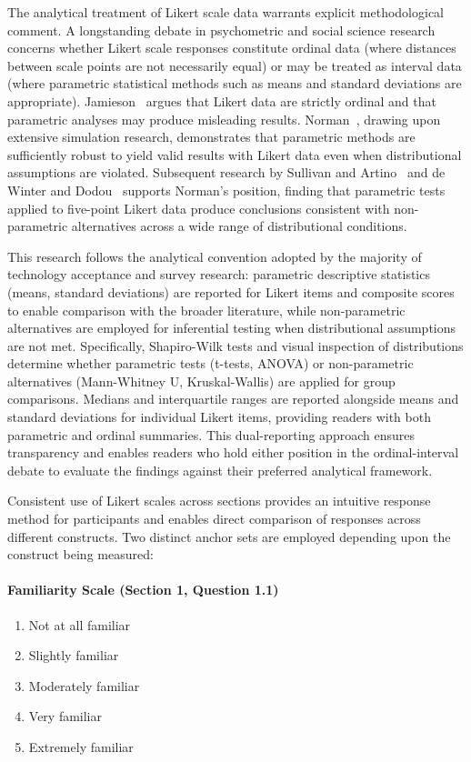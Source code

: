 The analytical treatment of Likert scale data warrants explicit methodological comment. A longstanding debate in psychometric and social science research concerns whether Likert scale responses constitute ordinal data (where distances between scale points are not necessarily equal) or may be treated as interval data (where parametric statistical methods such as means and standard deviations are appropriate). Jamieson~\parencite{Jamieson_2004} argues that Likert data are strictly ordinal and that parametric analyses may produce misleading results. Norman~\parencite{Norman_2010}, drawing upon extensive simulation research, demonstrates that parametric methods are sufficiently robust to yield valid results with Likert data even when distributional assumptions are violated. Subsequent research by Sullivan and Artino~\parencite{Sullivan_Artino_2013} and de Winter and Dodou~\parencite{deWinter_Dodou_2010} supports Norman's position, finding that parametric tests applied to five-point Likert data produce conclusions consistent with non-parametric alternatives across a wide range of distributional conditions.

This research follows the analytical convention adopted by the majority of technology acceptance and survey research: parametric descriptive statistics (means, standard deviations) are reported for Likert items and composite scores to enable comparison with the broader literature, while non-parametric alternatives are employed for inferential testing when distributional assumptions are not met. Specifically, Shapiro-Wilk tests and visual inspection of distributions determine whether parametric tests (t-tests, ANOVA) or non-parametric alternatives (Mann-Whitney U, Kruskal-Wallis) are applied for group comparisons. Medians and interquartile ranges are reported alongside means and standard deviations for individual Likert items, providing readers with both parametric and ordinal summaries. This dual-reporting approach ensures transparency and enables readers who hold either position in the ordinal-interval debate to evaluate the findings against their preferred analytical framework.

Consistent use of Likert scales across sections provides an intuitive response method for participants and enables direct comparison of responses across different constructs. Two distinct anchor sets are employed depending upon the construct being measured:

\paragraph{Familiarity Scale (Section 1, Question 1.1)}
\begin{enumerate}
  \item Not at all familiar
  \item Slightly familiar
  \item Moderately familiar
  \item Very familiar
  \item Extremely familiar
\end{enumerate}

